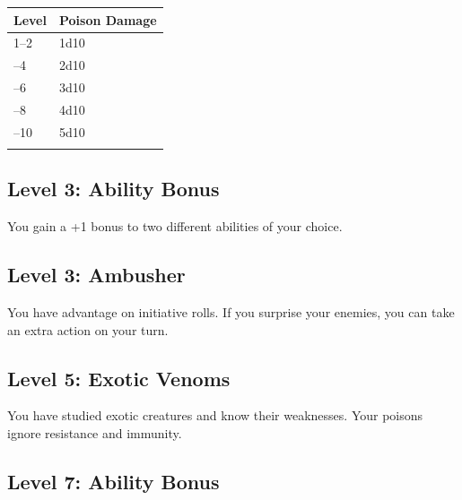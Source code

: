 \documentclass[12pt,letterpaper,twocolumn,openany,nodeprecatedcode,bg=none]{dndbook}
\let\oldsubsection\subsection
\renewcommand{\subsection}[1]{%
  \needspace{5\baselineskip}%
  \oldsubsection{#1}%
}
\begin{document}

{\def\LTcaptype{none} %
\begin{table}[!htbp]
\centering
\begin{tabular}{@{}
  >{\raggedright\arraybackslash}p{}
  >{\raggedright\arraybackslash}p{}@{}}
\toprule\noalign{}
\begin{minipage}[b]{\linewidth}\raggedright
Level
\end{minipage} & \begin{minipage}[b]{\linewidth}\raggedright
Poison Damage
\end{minipage} \\
\midrule\noalign{}
1--2 & 1d10 \\
3--4 & 2d10 \\
5--6 & 3d10 \\
7--8 & 4d10 \\
9--10 & 5d10 \\
\bottomrule\noalign{}
\end{tabular}
\end{table}
}

\subsection{Level 3: Ability Bonus}\label{level-3-ability-bonus}

You gain a +1 bonus to two different abilities of your choice.

\subsection{Level 3: Ambusher}\label{level-3-ambusher}

You have advantage on initiative rolls. If you surprise your enemies,
you can take an extra action on your turn.

\subsection{Level 5: Exotic Venoms}\label{level-5-exotic-venoms}

You have studied exotic creatures and know their weaknesses. Your
poisons ignore resistance and immunity.

\subsection{Level 7: Ability Bonus}\label{level-7-ability-bonus}
\end{document}
